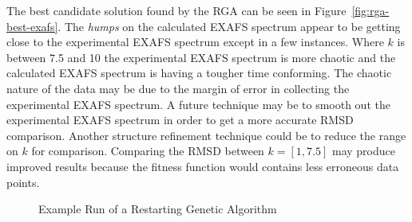 The best candidate solution found by the RGA can be seen in Figure~\ref{fig:rga-best-exafs}. The \textit{humps} on the calculated EXAFS spectrum appear to be getting close to the experimental EXAFS spectrum except in a few instances. Where $k$ is between 7.5 and 10 the experimental EXAFS spectrum is more chaotic and the calculated EXAFS spectrum is having a tougher time conforming. The chaotic nature of the data may be due to the margin of error in collecting the experimental EXAFS spectrum. A future technique may be to smooth out the experimental EXAFS spectrum in order to get a more accurate RMSD comparison. Another structure refinement technique could be to reduce the range on $k$ for comparison. Comparing the RMSD between $k = [1,7.5]$ may produce improved results because the fitness function would contains less erroneous data points.

\begin{figure}
	\centering
	\caption{Example Run of a Restarting Genetic Algorithm}
	\label{fig:rga-generational-data}
\end{figure}

\begin{figure*}
	\centering
	\caption{Best OEC EXAFS Spectra Comparison from RGA}
	\label{fig:rga-best-exafs}
\end{figure*}